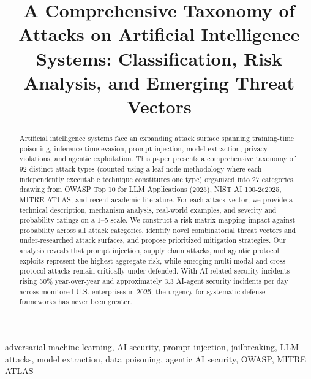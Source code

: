 \documentclass[conference]{IEEEtran}
\begin{document}
\title{A Comprehensive Taxonomy of Attacks on Artificial Intelligence Systems: Classification, Risk Analysis, and Emerging Threat Vectors}

\author{
}

\maketitle

\makeatletter
\let\origAlph\@Alph
\def\@Alph#1{\ifnum#1>26 \number#1\else\origAlph{#1}\fi}
\makeatother

\begin{abstract}
Artificial intelligence systems face an expanding attack surface spanning training-time poisoning, inference-time evasion, prompt injection, model extraction, privacy violations, and agentic exploitation. This paper presents a comprehensive taxonomy of 92 distinct attack types (counted using a leaf-node methodology where each independently executable technique constitutes one type) organized into 27 categories, drawing from OWASP Top 10 for LLM Applications (2025), NIST AI 100-2e2025, MITRE ATLAS, and recent academic literature. For each attack vector, we provide a technical description, mechanism analysis, real-world examples, and severity and probability ratings on a 1--5 scale. We construct a risk matrix mapping impact against probability across all attack categories, identify novel combinatorial threat vectors and under-researched attack surfaces, and propose prioritized mitigation strategies. Our analysis reveals that prompt injection, supply chain attacks, and agentic protocol exploits represent the highest aggregate risk, while emerging multi-modal and cross-protocol attacks remain critically under-defended. With AI-related security incidents rising 50\% year-over-year and approximately 3.3 AI-agent security incidents per day across monitored U.S. enterprises in 2025, the urgency for systematic defense frameworks has never been greater.
\end{abstract}

\begin{IEEEkeywords}
adversarial machine learning, AI security, prompt injection, jailbreaking, LLM attacks, model extraction, data poisoning, agentic AI security, OWASP, MITRE ATLAS
\end{IEEEkeywords}
\end{document}
